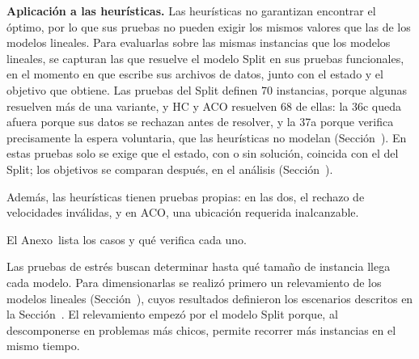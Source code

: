 {\bf Aplicación a las heurísticas.} Las heurísticas no garantizan encontrar
el óptimo, por lo que sus pruebas no pueden exigir los mismos valores que las
de los modelos lineales. Para evaluarlas sobre las mismas instancias que los
modelos lineales, se capturan las que resuelve el modelo Split en sus pruebas
funcionales, en el momento en que escribe sus archivos de datos, junto con el
estado y el objetivo que obtiene. Las pruebas
del Split definen 70 instancias, porque algunas resuelven más de una variante,
y HC y ACO resuelven 68 de ellas: la 36c queda afuera porque sus datos se
rechazan antes de resolver, y la 37a porque verifica precisamente la espera
voluntaria, que las heurísticas no modelan (Sección~).
En estas pruebas solo se exige que el estado, con o sin solución, coincida con
el del Split; los objetivos se comparan después, en el análisis
(Sección~).

Además, las heurísticas tienen pruebas propias: en las dos, el rechazo de
velocidades inválidas, y en ACO, una ubicación requerida inalcanzable.

El Anexo~ lista los casos y qué verifica cada uno.

\stopsection

\startsection[title={Pruebas de estrés}, reference=sec:pruebas_estres]

Las pruebas de estrés buscan determinar
hasta qué tamaño de instancia llega cada modelo. Para dimensionarlas se
realizó primero un relevamiento de los modelos lineales
(Sección~), cuyos resultados definieron los
escenarios descritos en la Sección~. El
relevamiento empezó por el modelo Split porque, al descomponerse en
problemas más chicos, permite recorrer más instancias en el mismo tiempo.

\startsubsection[title={Relevamiento inicial}, reference=sec:relevamiento]

